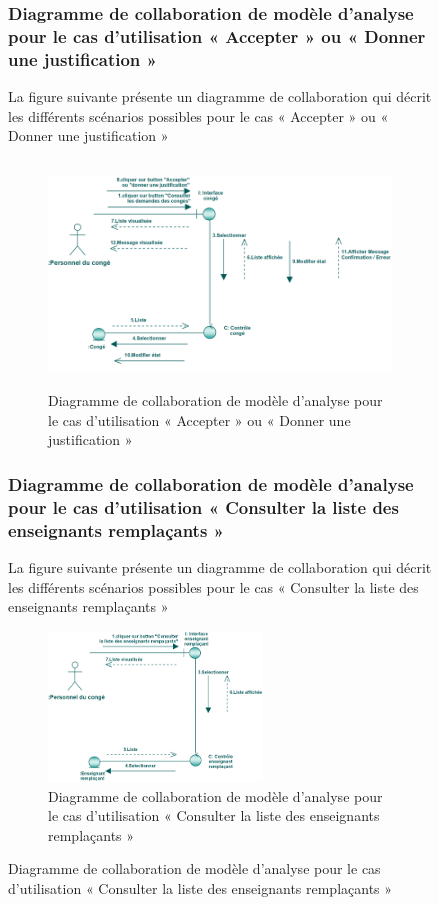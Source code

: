 \documentclass[12 pt]{report}
\begin{document}
\begin{figure}[h]
\begin{center}
\subsubsection{Diagramme  de  collaboration  de  modèle  d'analyse  pour  le  cas  d'utilisation « Accepter » ou  « Donner une justification »   }
La figure suivante présente un diagramme de collaboration qui décrit les différents
scénarios possibles pour le cas « Accepter » ou  « Donner une justification »  
\begin{figure}[h]
\begin{center}
\includegraphics[width= 12 cm , height =6cm]{colla_acc.PNG}
 \caption{Diagramme  de  collaboration  de  modèle  d'analyse  pour  le  cas  d'utilisation « Accepter » ou  « Donner une justification »  }
\end{center}
\end{figure}
\subsubsection{Diagramme  de  collaboration  de  modèle  d'analyse  pour  le  cas  d'utilisation « Consulter la liste des enseignants remplaçants »   }
La figure suivante présente un diagramme de collaboration qui décrit les différents
scénarios possibles pour le cas « Consulter la liste des enseignants remplaçants  »  
\begin{figure}[h]
\begin{center}
\includegraphics[width= 12 cm , height =4cm]{colla_con_rem.PNG}
 \caption{Diagramme  de  collaboration  de  modèle  d'analyse  pour  le  cas  d'utilisation « Consulter la liste des enseignants remplaçants  »  }
\end{center}
\end{figure}

\end{center}
\end{figure}
\end{document}
